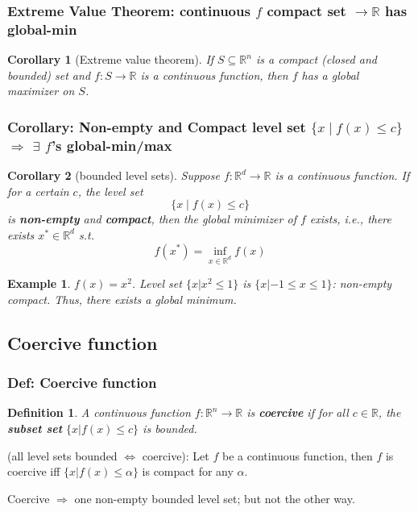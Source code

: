 \documentclass[11pt,a4paper]{article}
\newtheorem{example}{Example}
\newtheorem{corollary}{Corollary}
\newtheorem{definition}{Definition}
\begin{document}
\subsubsection{Extreme Value Theorem: continuous $f$ compact set $\rightarrow \mathbb{R}$ has global-min}
\begin{corollary}[Extreme value theorem]
    If $S\subseteq \mathbb{R}^n$ is a compact (closed and bounded) set and $f: S \rightarrow \mathbb{R}$ is a continuous function, then $f$ has a global maximizer on $S$.
\end{corollary}


\subsubsection{Corollary: Non-empty and Compact level set $\{x \mid f(x) \leq c\}$ $\Rightarrow$ $\exists$ $f$'s global-min/max} 

\begin{corollary}[bounded level sets]
    Suppose $f: \mathbb{R}^{d} \rightarrow \mathbb{R}$ is a continuous function. If for a certain $c$, the level set
    $$
    \{x \mid f(x) \leq c\}
    $$
    is \textbf{non-empty} and \textbf{compact}, then the global minimizer of $f$ exists, i.e., there exists $x^{*} \in \mathbb{R}^{d}$ s.t.
    $$
    f\left(x^{*}\right)=\inf _{x \in \mathbb{R}^{d}} f(x)
    $$
\end{corollary}
\begin{example}
    $f(x) = x^2$.
    Level set $\{x|x^2 \leq 1\}$ is $\{x|-1\leq x\leq 1\}$: non-empty compact. Thus, there exists a global minimum.
\end{example}
\subsection{Coercive function}
\subsubsection{Def: Coercive function}
\begin{definition}
    A continuous function $f: \mathbb{R}^n \rightarrow \mathbb{R}$ is \textbf{coercive} if for all $c\in \mathbb{R}$, the \textbf{subset set} $\{x | f(x) \leq c\}$ is bounded.
\end{definition}
(all level sets bounded $\Leftrightarrow$ coercive): Let $f$ be a continuous function, then $f$ is coercive iff $\{x | f(x) \leq \alpha\}$ is compact for any $\alpha$.

Coercive $\Rightarrow$ one non-empty bounded level set; but not the other way.
\end{document}
